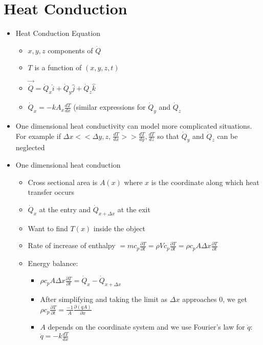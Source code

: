 \documentclass[12pt]{article}
\begin{document}
\section{Heat Conduction}
\begin{itemize}
    \item Heat Conduction Equation \begin{itemize}
    \item $x,y,z$ components of $\dot{Q}$
    \item $T$ is a function of $(x,y,z,t)$
    \item $\vec{\dot{Q}} = \dot{Q}_x \hat{i} + \dot{Q}_y \hat{j} + \dot{Q}_z \hat{k}$
    \item $\dot{Q}_x = -k A_x \frac{dT}{dx}$ (similar expressions for $\dot{Q}_y$ and $\dot{Q}_z$
    \end{itemize}
    \item One dimensional heat conductivity can model more complicated situations. For example if $\Delta x < < \Delta y, z$, $\frac{dT}{dx} >> \frac{dT}{dy},  \frac{dT}{dz}$ so that $\dot{Q}_y$ and $\dot{Q}_z$ can be neglected 
    \item One dimensional heat conduction \begin{itemize}
        \item Cross sectional area is $A(x)$ where $x$ is the coordinate along which heat transfer occurs
        \item $\dot{Q}_x$ at the entry and $\dot{Q}_{x + \Delta x}$ at the exit
        \item Want to find $T(x)$ inside the object
        \item Rate of increase of enthalpy $ = m c_p \frac{\partial T}{\partial t} = \rho V c_p \frac{\partial T}{\partial t} = \rho c_p A \Delta x \frac{\partial T}{\partial t}$
        \item Energy balance: \begin{itemize}
            \item $\rho c_p A \Delta x \frac{\partial T}{\partial t} = \dot{Q}_x - \dot{Q}_{x + \Delta x}$
            \item After simplifying and taking the limit as $\Delta x$ approaches 0, we get $\rho c_p \frac{\partial T}{\partial t} = \frac{-1}{A} \frac{\partial (\dot{q} A)}{\partial x}$
            \item $A$ depends on the coordinate system and we use Fourier's law for $\dot{q}$: $\dot{q} = -k \frac{dT}{dx}$        \end{itemize}
    \end{itemize}

\end{itemize}
\end{document}
